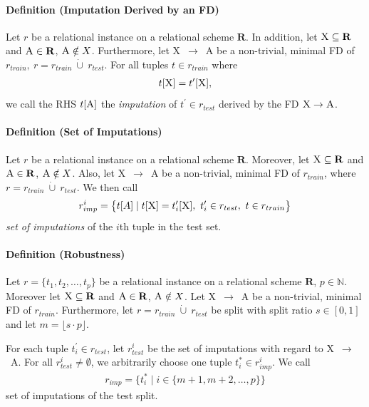 \paragraph{Definition (Imputation Derived by an FD)}
Let \( r \) be a relational instance on a relational scheme \( \mathbf{R} \).
In addition, let \( \textsc{X} \subseteq \mathbf{R} \) and \( \textsc{A} \in \mathbf{R} \), \( \textsc{A} \notin X\).
Furthermore, let \textsc{X}~\( \rightarrow \)~\textsc{A} be a non-trivial, minimal FD of \( r_{train},~r = r_{train}~\dot\cup~r_{test} \).
For all tuples \( t \in r_{train} \) where
\begin{align}\label{eq:fd-imputation}
    t[\textsc{X}] = t^{\prime}[\textsc{X}],
\end{align}
we call the RHS \( t[\textsc{A}] \) the \emph{imputation} of \( t^{\prime} \in r_{test} \) derived by the FD \( \textsc{X} \rightarrow \textsc{A} \).

\paragraph{Definition (Set of Imputations)}
Let \( r \) be a relational instance on a relational scheme \( \mathbf{R} \).
Moreover, let \( \textsc{X} \subseteq \mathbf{R} \) and \( \textsc{A} \in \mathbf{R} \), \( \textsc{A} \notin X\).
Also, let \textsc{X}~\( \rightarrow \)~\textsc{A} be a non-trivial, minimal FD of \( r_{train} \), where \( r = r_{train}~\dot\cup~r_{test} \).
We then call
\begin{align}
    r_{imp}^{i} = \big\{ t[A] \mid t[\textsc{X}] = t^{\prime}_{i}[\textsc{X}],~t^{\prime}_{i} \in r_{test},~t \in r_{train} \big\}
\end{align}
\emph{set of imputations} of the \( i \)th tuple in the test set.

\paragraph{Definition (Robustness)}
Let \( r = \{ t_1, t_2, \dots, t_p \}\) be a relational instance on a relational scheme \( \mathbf{R} \), \( p \in \mathbb{N} \).
Moreover let \( \textsc{X} \subseteq \mathbf{R} \) and \( \textsc{A} \in \mathbf{R} \), \( \textsc{A} \notin X\).
Let \textsc{X}~\( \rightarrow \)~\textsc{A} be a non-trivial, minimal FD of \( r_{train} \).
Furthermore, let \( r = r_{train}~\dot\cup~r_{test} \) be split with split ratio \( s \in [0, 1] \) and let \( m = \lfloor s \cdot p \rfloor \).

For each tuple \( t^{\prime}_i \in r_{test} \), let \( r^{i}_{test} \) be the set of imputations with regard to \textsc{X}~\( \rightarrow \)~\textsc{A}.
For all \( r^{i}_{test} \neq \emptyset \), we arbitrarily choose one tuple \( t_{i}^{\ast} \in r_{imp}^i \).
We call
\begin{align}\label{eq:imputation-set}
    r_{imp} = \big\{ t_{i}^{\ast} \mid i \in \{ m + 1, m + 2, \dots, p \} \big\}
\end{align}
set of imputations of the test split.

